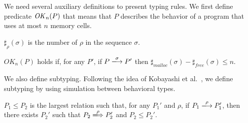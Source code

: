 
We need several auxiliary definitions to present typing rules.  We
first define predicate \(\mathit{OK}_n(P)\) that means that \(P\) describes
the behavior of a program that uses at most \(n\) memory cells.

\begin{myDef}[\(\sharp_{\rho}(\sigma)\)]
 \label{df:sharf}
\(\sharp_{\rho}(\sigma)\) is the number of \(\rho\) in the sequence
\(\sigma\).
\end{myDef}


\begin{myDef}
\label{df:okn}
\(OK_{n}(P)\) holds if, for any \(P'\), if \(P
\xlongrightarrow{\sigma}P'\) then
\(\sharp_{malloc}(\sigma)-\sharp_{free}(\sigma)\le n\).
\end{myDef}

We also define subtyping.  Following the idea of Kobayashi et
al.~\cite{DBLP:journals/tcs/IgarashiK04}, we define subtyping by
using simulation between behavioral types.

 \begin{myDef}[Subtyping]

\(P_1 \le P_2\) is the largest relation such that, for any \(P_1'\)
and \(\rho\), if \(P_1 \xlongrightarrow{\rho} P_1'\), then there
exists \(P_2'\) such that \(P_2 \xLongrightarrow{\rho} P_2'\) and
\(P_2 \le P_2'\).

\label{df:subtype}
\end{myDef}

